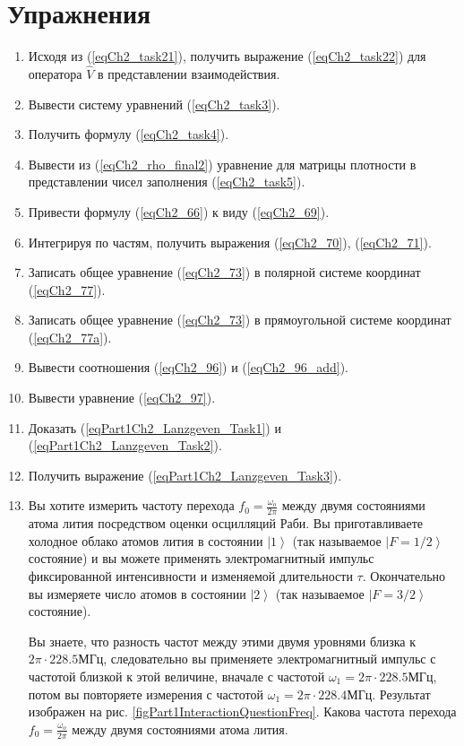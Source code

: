 \section{Упражнения}
\begin{enumerate}
\item Исходя из (\ref{eqCh2_task21}), получить выражение
  (\ref{eqCh2_task22}) для оператора $\hat{V}$ в представлении
  взаимодействия. 
\item Вывести систему уравнений (\ref{eqCh2_task3}).
\item Получить формулу (\ref{eqCh2_task4}).
\item Вывести из (\ref{eqCh2_rho_final2}) уравнение для матрицы
  плотности в представлении чисел заполнения (\ref{eqCh2_task5}). 
\item Привести формулу (\ref{eqCh2_66}) к виду (\ref{eqCh2_69}).
\item Интегрируя по частям, получить выражения (\ref{eqCh2_70}),
  (\ref{eqCh2_71}).
\item Записать общее уравнение (\ref{eqCh2_73}) в полярной системе
  координат (\ref{eqCh2_77}). 
\item Записать общее уравнение (\ref{eqCh2_73}) в прямоугольной
  системе координат (\ref{eqCh2_77a}). 
\item Вывести соотношения (\ref{eqCh2_96}) и (\ref{eqCh2_96_add}).
\item Вывести уравнение (\ref{eqCh2_97}).
\item Доказать (\ref{eqPart1Ch2_Lanzgeven_Task1}) и (\ref{eqPart1Ch2_Lanzgeven_Task2}).
\item Получить выражение (\ref{eqPart1Ch2_Lanzgeven_Task3}).
\item Вы хотите измерить частоту перехода $f_0 = \frac{\omega_o}{2
  \pi}$ между двумя состояниями атома лития посредством оценки
  осцилляций Раби. Вы приготавливаете холодное облако атомов лития в
  состоянии $\left|1\right>$ (так называемое $\left|F=1/2\right>$
  состояние) и вы можете применять электромагнитный импульс
  фиксированной интенсивности и изменяемой длительности
  $\tau$. Окончательно вы измеряете число атомов в состоянии
  $\left|2\right>$ (так называемое $\left|F=3/2\right>$
  состояние).

  Вы знаете, что разность частот между этими двумя уровнями близка к
  $2 \pi \cdot 228.5 \mbox{МГц}$, следовательно вы применяете
  электромагнитный импульс с частотой близкой к этой величине, вначале
  с частотой $\omega_1 = 2 \pi \cdot 228.5 \mbox{МГц}$, потом вы повторяете
  измерения с частотой $\omega_1 = 2 \pi \cdot 228.4 \mbox{МГц}$. Результат
  изображен на рис. \ref{figPart1InteractionQuestionFreq}. Какова
  частота перехода $f_0 = \frac{\omega_o}{2 \pi}$ между двумя
  состояниями атома лития. 
\end{enumerate}


